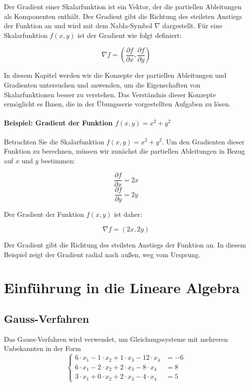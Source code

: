 \documentclass[11pt, openany]{book}
\begin{document}
Der Gradient einer Skalarfunktion ist ein Vektor, der die partiellen Ableitungen als Komponenten enthält. Der Gradient gibt die Richtung des steilsten Anstiegs der Funktion an und wird mit dem Nabla-Symbol $\nabla$ dargestellt. Für eine Skalarfunktion $f(x, y)$ ist der Gradient wie folgt definiert:

\[\nabla f = \left(\frac{\partial f}{\partial x}, \frac{\partial f}{\partial y}\right)\]

In diesem Kapitel werden wir die Konzepte der partiellen Ableitungen und Gradienten untersuchen und anwenden, um die Eigenschaften von Skalarfunktionen besser zu verstehen. Das Verständnis dieser Konzepte ermöglicht es Ihnen, die in der Übungsserie vorgestellten Aufgaben zu lösen.

\subsubsection{Beispiel: Gradient der Funktion $f(x, y) = x^2 + y^2$}

Betrachten Sie die Skalarfunktion $f(x, y) = x^2 + y^2$. Um den Gradienten dieser Funktion zu berechnen, müssen wir zunächst die partiellen Ableitungen in Bezug auf $x$ und $y$ bestimmen:

\[\frac{\partial f}{\partial x} = 2x\]
\[\frac{\partial f}{\partial y} = 2y\]

Der Gradient der Funktion $f(x, y)$ ist daher:

\[\nabla f = \left(2x, 2y\right)\]

Der Gradient gibt die Richtung des steilsten Anstiegs der Funktion an. In diesem Beispiel zeigt der Gradient radial nach außen, weg vom Ursprung.

\newpage


\chapter{Einführung in die Lineare Algebra}
\section{Gauss-Verfahren}
Das Gauss-Verfahren wird verwendet, um Gleichungssysteme mit mehreren Unbekannten in der Form
{\small
\[
\left\{
\begin{aligned}
  6\cdot x_1 - 1\cdot x_2 + 1\cdot x_3 - 12\cdot x_4 &= -6 \\
  6\cdot x_1 - 2\cdot x_2 + 2\cdot x_3 - 8\cdot x_4 &= 8 \\
  3\cdot x_1 + 0\cdot x_2 + 2\cdot x_3 - 4\cdot x_4 &= 5
\end{aligned}
\right.
\]}
\end{document}
